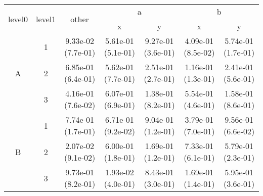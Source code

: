 \begin{tabular}{ccccccc}
\toprule
\multirow{2}{*}{level0} & \multirow{2}{*}{level1}& \multirow{2}{*}{other}&\multicolumn{2}{c}{a}&\multicolumn{2}{c}{b}\tabularnewline
\cmidrule(lr){4-5}
\cmidrule(lr){6-7}
&&&x&y&x&y\tabularnewline
\midrule
\multirow{3}{*}{A}&1& 9.33e-02 (7.7e-01)& 5.61e-01 (5.1e-01)& 9.27e-01 (3.6e-01)& 4.09e-01 (8.5e-02)& 5.74e-01 (1.7e-01)\tabularnewline
&2& 6.85e-01 (6.4e-01)& 5.62e-01 (7.7e-01)& 2.51e-01 (2.7e-01)& 1.16e-01 (1.3e-01)& 2.41e-01 (5.6e-01)\tabularnewline
&3& 4.16e-01 (7.6e-02)& 6.07e-01 (6.9e-01)& 1.38e-01 (8.2e-01)& 5.54e-01 (4.6e-01)& 1.58e-01 (8.6e-01)\tabularnewline
\midrule
\multirow{3}{*}{B}&1& 7.74e-01 (1.7e-01)& 6.71e-01 (9.2e-02)& 9.04e-01 (1.2e-01)& 3.79e-01 (7.0e-01)& 9.56e-01 (6.6e-02)\tabularnewline
&2& 2.07e-02 (9.1e-02)& 6.00e-01 (1.8e-01)& 1.69e-01 (1.2e-01)& 7.33e-01 (6.1e-01)& 5.79e-01 (2.3e-01)\tabularnewline
&3& 9.73e-01 (8.2e-01)& 1.93e-02 (4.0e-01)& 8.43e-01 (3.0e-01)& 1.69e-01 (1.4e-01)& 5.95e-01 (3.6e-01)\tabularnewline
\bottomrule
\end{tabular}
